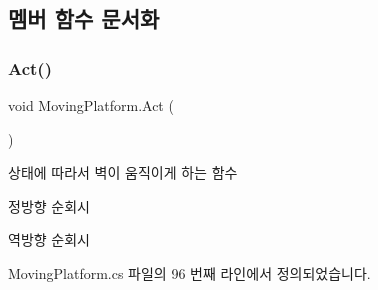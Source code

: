 \subsection{멤버 함수 문서화}
\mbox{\label{class_moving_platform_ab4a3f15333f41ba4a3b9bc0227777460}} 
\subsubsection{\texorpdfstring{Act()}{Act()}}
{\footnotesize\ttfamily void Moving\+Platform.\+Act (\begin{DoxyParamCaption}{ }\end{DoxyParamCaption})\hspace{0.3cm}{\ttfamily [private]}}



상태에 따라서 벽이 움직이게 하는 함수 

정방향 순회시

역방향 순회시 

Moving\+Platform.\+cs 파일의 96 번째 라인에서 정의되었습니다.


